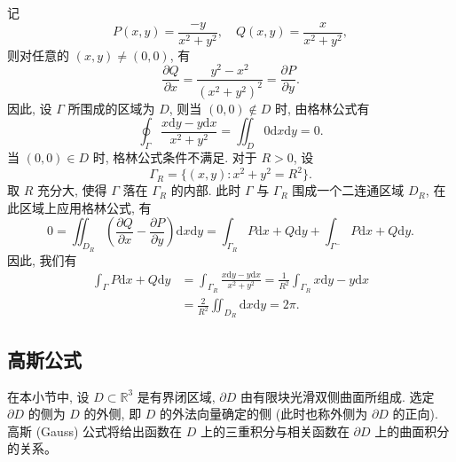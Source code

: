 \documentclass[UTF8,12pt,a4paper,fontset=fandol]{ctexart}
\begin{document}
\begin{solve}\quad 记
\[
  P(x,y)=\frac{-y}{x^2+y^2},\quad Q(x,y)=\frac{x}{x^2+y^2},
\]
则对任意的 $(x,y)\ne(0,0)$, 有
\[
  \frac{\partial Q}{\partial x}=\frac{y^2-x^2}{(x^2+y^2)^2}=\frac{\partial P}{\partial y}.
\]
因此, 设 $\Gamma$ 所围成的区域为 $D$, 则当 $(0,0)\notin D$ 时, 由格林公式有
\[
  \oint_\Gamma\frac{x\mathrm dy-y\mathrm dx}{x^2+y^2}
  =\iint_D0\mathrm dx\mathrm dy=0.
\]
当 $(0,0)\in D$ 时, 格林公式条件不满足. 对于 $R>0$, 设
\[
  \Gamma_R=\{(x,y):x^2+y^2=R^2\}.
\]
取 $R$ 充分大, 使得 $\Gamma$ 落在 $\Gamma_R$ 的内部. 此时 $\Gamma$ 与 $\Gamma_R$ 围成一个二连通区域 $D_R$, 在此区域上应用格林公式, 有
\[
  0=\iint_{D_R}\left(\frac{\partial Q}{\partial x}-\frac{\partial P}{\partial y}\right)\mathrm dx\mathrm dy
  =\int_{\Gamma_R}P\mathrm dx+Q\mathrm dy+\int_{\Gamma^-}P\mathrm dx+Q\mathrm dy.
\]
因此, 我们有
\[
\begin{aligned}
  \int_\Gamma P\mathrm dx+Q\mathrm dy
  &=\int_{\Gamma_R}\frac{x\mathrm dy-y\mathrm dx}{x^2+y^2}
    =\frac1{R^2}\int_{\Gamma_R}x\mathrm dy-y\mathrm dx\\
  &=\frac2{R^2}\iint_{D_R}\mathrm dx\mathrm dy=2\pi.
\end{aligned}
\]

\end{solve}
\subsection{高斯公式}

在本小节中, 设 $D\subset\mathbb R^3$ 是有界闭区域, $\partial D$ 由有限块光滑双侧曲面所组成. 选定 $\partial D$ 的侧为 $D$ 的外侧, 即 $D$ 的外法向量确定的侧 (此时也称外侧为 $\partial D$ 的正向). 高斯 (Gauss) 公式将给出函数在 $D$ 上的三重积分与相关函数在 $\partial D$ 上的曲面积分的关系。
\end{document}
